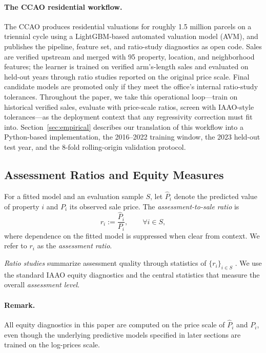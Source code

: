 \documentclass{article}
\theoremstyle{plain}
\theoremstyle{definition}
\newcommand{\1}{\mathbf{1}}
\begin{document}
\paragraph{The CCAO residential workflow.}
The CCAO produces residential valuations for roughly 1.5 million parcels on a triennial cycle using a LightGBM-based automated valuation model (AVM), and publishes the pipeline, feature set, and ratio-study diagnostics as open code. Sales are verified upstream and merged with 95 property, location, and neighborhood features; the learner is trained on verified arm's-length sales and evaluated on held-out years through ratio studies reported on the original price scale. Final candidate models are promoted only if they meet the office's internal ratio-study tolerances. Throughout the paper, we take this operational loop---train on historical verified sales, evaluate with price-scale ratios, screen with IAAO-style tolerances---as the deployment context that any regressivity correction must fit into. Section~\ref{sec:empirical} describes our translation of this workflow into a Python-based implementation, the 2016--2022 training window, the 2023 held-out test year, and the 8-fold rolling-origin validation protocol.

\subsection{Assessment Ratios and Equity Measures}
\label{subsec:equity_metrics}

For a fitted model and an evaluation sample $S$, let $\widehat P_i$ denote the predicted value of property $i$ and $P_i$ its observed sale price. The \emph{assessment-to-sale ratio} is
\begin{equation}
\label{eq:ratio_def}
r_i := \frac{\widehat P_i}{P_i},
\qquad \forall i\in S,
\end{equation}
where dependence on the fitted model is suppressed when clear from context. We refer to $r_i$ as the \emph{assessment ratio}.

\emph{Ratio studies} summarize assessment quality through statistics of $\{r_i\}_{i\in S}$ \cite{IAAO2025ExposureRatio}. We use the standard IAAO equity diagnostics and the central statistics that measure the overall \emph{assessment level}.

\paragraph{Remark.} All equity diagnostics in this paper are computed on the price scale of $\widehat P_i$ and $P_i$, even though the underlying predictive models specified in later sections are trained on the log-prices scale.
\end{document}
